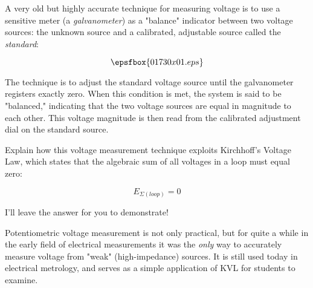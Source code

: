 

A very old but highly accurate technique for measuring voltage is to use a sensitive meter (a {\it galvanometer}) as a "balance" indicator between two voltage sources: the unknown source and a calibrated, adjustable source called the {\it standard}:

$$\epsfbox{01730x01.eps}$$

The technique is to adjust the standard voltage source until the galvanometer registers exactly zero.  When this condition is met, the system is said to be "balanced," indicating that the two voltage sources are equal in magnitude to each other.  This voltage magnitude is then read from the calibrated adjustment dial on the standard source.

Explain how this voltage measurement technique exploits Kirchhoff's Voltage Law, which states that the algebraic sum of all voltages in a loop must equal zero:

$$E_{\Sigma (loop)} = 0$$







I'll leave the answer for you to demonstrate!







Potentiometric voltage measurement is not only practical, but for quite a while in the early field of electrical measurements it was the {\it only} way to accurately measure voltage from "weak" (high-impedance) sources.  It is still used today in electrical metrology, and serves as a simple application of KVL for students to examine.




